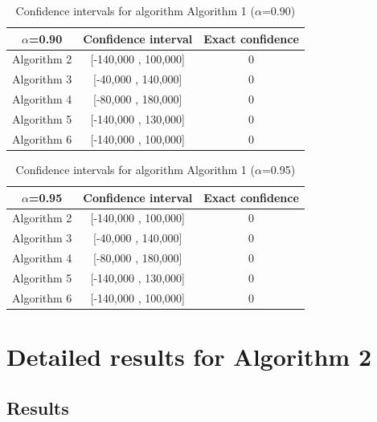 \documentclass[a4paper,10pt]{article}
\begin{document}
\begin{table}[!htp]
\centering\small
\begin{tabular}{
|c|c|c|}
\hline
 $\alpha$=0.90 & Confidence interval & Exact confidence \\ \hline 
Algorithm 2 & [-140,000 , 100,000] & 0\\ \hline 
Algorithm 3 & [-40,000 , 140,000] & 0\\ \hline 
Algorithm 4 & [-80,000 , 180,000] & 0\\ \hline 
Algorithm 5 & [-140,000 , 130,000] & 0\\ \hline 
Algorithm 6 & [-140,000 , 100,000] & 0\\ \hline 

\end{tabular}
\caption{Confidence intervals for algorithm Algorithm 1 ($\alpha$=0.90)}
\end{table}
\begin{table}[!htp]
\centering\small
\begin{tabular}{
|c|c|c|}
\hline
 $\alpha$=0.95 & Confidence interval & Exact confidence \\ \hline 
Algorithm 2 & [-140,000 , 100,000] & 0\\ \hline 
Algorithm 3 & [-40,000 , 140,000] & 0\\ \hline 
Algorithm 4 & [-80,000 , 180,000] & 0\\ \hline 
Algorithm 5 & [-140,000 , 130,000] & 0\\ \hline 
Algorithm 6 & [-140,000 , 100,000] & 0\\ \hline 

\end{tabular}
\caption{Confidence intervals for algorithm Algorithm 1 ($\alpha$=0.95)}
\end{table}

 \clearpage 


\section{Detailed results for Algorithm 2}


\subsection{Results}
\end{document}
